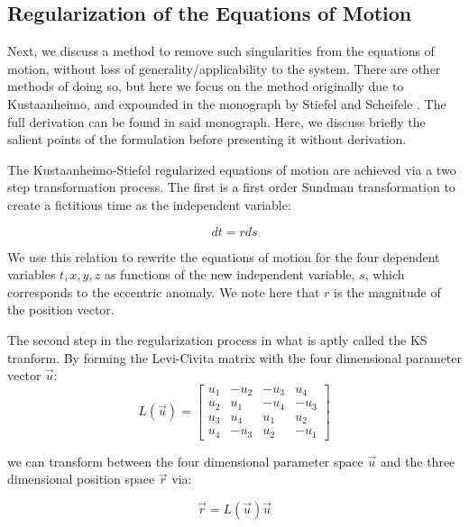 \documentclass[11pt,twoside,letterpaper]{article}
\begin{document}
  \subsection {Regularization of the Equations of Motion}
  Next, we discuss a method to remove such singularities from the
  equations of motion, without loss of generality/applicability to the
  system. There are other methods of doing so, but here we focus on
  the method originally due to Kustaanheimo, and expounded in the
  monograph by Stiefel and Scheifele \cite{stiefel_1971}. The full
  derivation can be found in said monograph. Here, we discuss briefly
  the salient points of the formulation before presenting it without
  derivation.

  The Kustaanheimo-Stiefel regularized equations of motion are
  achieved via a two step transformation process. The first is a first
  order Sundman transformation to create a fictitious time as the
  independent variable:

  \begin{equation}
    dt = rds
  \end{equation}

  We use this relation to rewrite the equations of motion for the four
  dependent variables \(t, x, y, z\) as functions of the new
  independent variable, \(s\), which corresponds to the eccentric
  anomaly. We note here that \(r\) is the magnitude of the position
  vector.
 
  The second step in the regularization process in what is aptly
  called the KS tranform. By forming the Levi-Civita matrix with the
  four dimensional parameter vector \(\vec{u}\):
  \begin{equation} \label{levi}
    L(\vec{u}) =
    \begin{bmatrix}
      u_1 & -u_2& -u_3& u_4 \\
      u_2 & u_1 & -u_4& -u_3 \\
      u_3 & u_4 & u_1 & u_2 \\
      u_4 & -u_3& u_2 & -u_1
    \end{bmatrix}
  \end{equation}

  we can transform between the four dimensional parameter space
  \(\vec{u}\) and the three dimensional position space \(\vec{r}\)
  via:

  \begin{equation} \label{xtrans}
    \vec{r} = L(\vec{u})\vec{u}
  \end{equation}
\end{document}
